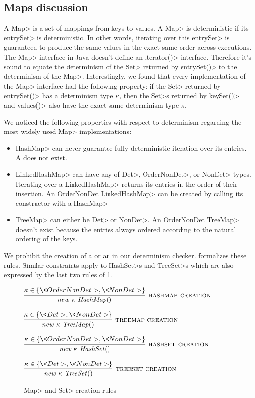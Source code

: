 \subsection{Maps discussion}\label{maps}
A \<Map> is a set of mappings from keys to values. A \<Map> is deterministic if its \<entrySet> is deterministic.
In other words, iterating over this \<entrySet> is guaranteed to produce the same values in the exact same order across executions.
The \<Map> interface in Java doesn't define an \<iterator()> interface. Therefore it's sound to equate the determinism of the \<Set>
returned by \<entrySet()> to the determinism of the \<Map>. Interestingly, we found that every implementation of the \<Map> 
interface had the following property: if the \<Set> returned by \<entrySet()> has a determinism type $\kappa$, then
the \<Set>s returned by \<keySet()> and \<values()> also have the exact same determinism type $\kappa$.

We noticed the following properties with respect to determinism regarding the most widely used \<Map> implementations:
\begin{itemize}
    \item \<HashMap> can never guarantee fully deterministic iteration over its entries. A  does not exist.
    \item \<LinkedHashMap> can have any of \<Det>, \<OrderNonDet>, or \<NonDet> types. Iterating over a \<LinkedHashMap> returns
    its entries in the order of their insertion. An \<OrderNonDet LinkedHashMap> can be created by calling its constructor with a \<HashMap>.
    \item \<TreeMap> can either be \<Det> or \<NonDet>. An \<OrderNonDet TreeMap> doesn't exist because the entries always ordered according
    to the natural ordering of the keys. 
\end{itemize}

We prohibit the creation of a  or an  in our determinism checker.
 formalizes these rules. Similar constraints apply to \<HashSet>s and \<TreeSet>s which are
also expressed by the last two rules of \cref{fig-creation-rules}.

\begin{figure}
    $\infer[\rulename{hashmap creation}]{\|new \ \kappa\ HashMap()|}{\kappa \in \{ \<OrderNonDet>, \<NonDet> \}}$
    
    \bigskip
    
    $\infer[\rulename{treemap creation}]{\|new \ \kappa\ TreeMap()|}{\kappa \in \{ \<Det>, \<NonDet> \}}$
    
    \bigskip
    
    $\infer[\rulename{hashset creation}]{\|new \ \kappa\ HashSet()|}{\kappa \in \{ \<OrderNonDet>, \<NonDet> \}}$
    
    \bigskip
    
    $\infer[\rulename{treeset creation}]{\|new \ \kappa\ TreeSet()|}{\kappa \in \{ \<Det>, \<NonDet> \}}$
    \caption{\<Map> and \<Set> creation rules}
    \label{fig-creation-rules}
\end{figure}

